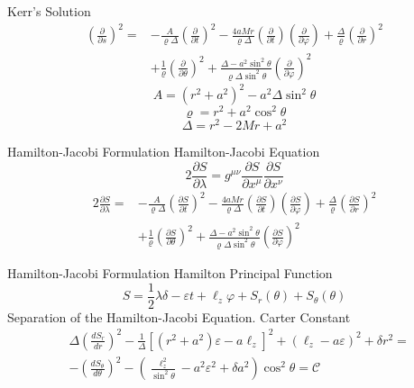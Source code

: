 \documentclass{beamer}
\begin{document}
\begin{darkframes}
\begin{frame}{Kerr's Solution}
     	\begin{align*}
            \left( \frac{\partial}{\partial s} \right)^{2} = &- \frac{A}{\varrho \Delta} \left( \frac{\partial}{\partial t} \right)^{2} - \frac{4aMr}{\varrho \Delta} \left( \frac{\partial}{\partial t} \right) \left( \frac{\partial}{\partial \varphi} \right) +\frac{\Delta}{\varrho}\left( \frac{\partial}{\partial r} \right)^2 \nonumber \\
             & + \frac{1}{\varrho} \left( \frac{\partial}{\partial \theta} \right)^{2} + \frac{\Delta - a^2 \sin^2 \theta}{\varrho \Delta \sin^{2}\theta} \left( \frac{\partial}{\partial \varphi} \right)^{2}
      	\end{align*}
    \pause
    $$A = (r^2 + a^2)^2 -a^2 \Delta \sin^2 \theta$$ 	
   	$$\varrho  = r^{2}+a^{2}\cos^{2}\theta$$
    $$\Delta =  r^{2}-2Mr+a^{2}$$
\end{frame}

\begin{frame}{Hamilton-Jacobi Formulation}
    Hamilton-Jacobi Equation
     \[ 2 \frac{\partial S}{\partial \lambda}  = g^{\mu\nu} \frac{\partial S}{\partial x^\mu} \frac{\partial S}{\partial x^\nu} \]
    \pause
    \begin{align*}
           2 \frac{\partial S}{\partial \lambda} = &- \frac{A}{\varrho \Delta} \left( \frac{\partial S}{\partial t} \right)^2 - \frac{4aMr}{\varrho \Delta} \left( \frac{\partial S}{\partial t} \right) \left( \frac{\partial S}{\partial \varphi} \right) +\frac{\Delta}{\varrho}\left( \frac{\partial S}{\partial r} \right)^2 \nonumber \\
             & + \frac{1}{\varrho} \left( \frac{\partial S}{\partial \theta} \right)^{2} + \frac{\Delta - a^2 \sin^2 \theta}{\varrho \Delta \sin^{2}\theta} \left( \frac{\partial S}{\partial \varphi} \right)^{2}
    \end{align*}   
\end{frame}

\begin{frame}{Hamilton-Jacobi Formulation}
    Hamilton Principal Function
    \[S = \frac{1}{2} \lambda \delta -\varepsilon t +\ell_z \varphi + S_r (\theta) + S_\theta (\theta)\]
	Separation of the Hamilton-Jacobi Equation. Carter Constant
	\begin{align*}
	&\Delta \left( \frac{dS_r}{dr}\right)^2 - \frac{1}{\Delta} \left[ (r^2 +a^2) \varepsilon - a \ell_z \right]^2 + (\ell_z - a \varepsilon)^2 + \delta r^2  =\\
	& -\left( \frac{dS_\theta}{d\theta}\right)^2 - \left(\frac{\ell_z^2}{\sin^2 \theta} - a^2 \varepsilon^2 + \delta a^2 \right)\cos^2 \theta = \mathcal{C}
	\end{align*}      
\end{frame}


\end{darkframes}
\end{document}

